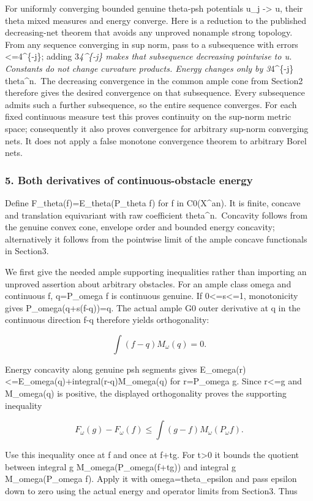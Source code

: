 \documentclass[
  10pt,
]{article}
\begin{document}
For uniformly converging bounded genuine theta-psh potentials u\_j
-\textgreater{} u, their theta mixed measures and energy converge. Here
is a reduction to the published decreasing-net theorem that avoids any
unproved nonample strong topology. From any sequence converging in sup
norm, pass to a subsequence with errors \textless=4\^{}\{-j\}; adding
3\emph{4\^{}\{-j\} makes that subsequence decreasing pointwise to u.
Constants do not change curvature products. Energy changes only by
3}4\^{}\{-j\} theta\^{}n.~The decreasing convergence in the common ample
cone from Section2 therefore gives the desired convergence on that
subsequence. Every subsequence admits such a further subsequence, so the
entire sequence converges. For each fixed continuous measure test this
proves continuity on the sup-norm metric space; consequently it also
proves convergence for arbitrary sup-norm converging nets. It does not
apply a false monotone convergence theorem to arbitrary Borel nets.

\subsubsection{5. Both derivatives of continuous-obstacle
energy}\label{both-derivatives-of-continuous-obstacle-energy}

Define F\_theta(f)=E\_theta(P\_theta f) for f in C0(X\^{}an). It is
finite, concave and translation equivariant with raw coefficient
theta\^{}n.~Concavity follows from the genuine convex cone, envelope
order and bounded energy concavity; alternatively it follows from the
pointwise limit of the ample concave functionals in Section3.

We first give the needed ample supporting inequalities rather than
importing an unproved assertion about arbitrary obstacles. For an ample
class omega and continuous f, q=P\_omega f is continuous genuine. If
0\textless=s\textless=1, monotonicity gives P\_omega(q+s(f-q))=q. The
actual ample G0 outer derivative at q in the continuous direction f-q
therefore yields orthogonality:

\[\int(f-q)M_\omega(q)=0.\]

Energy concavity along genuine psh segments gives
E\_omega(r)\textless=E\_omega(q)+integral(r-q)M\_omega(q) for r=P\_omega
g. Since r\textless=g and M\_omega(q) is positive, the displayed
orthogonality proves the supporting inequality

\[F_\omega(g)-F_\omega(f)\leq\int(g-f)M_\omega(P_\omega f).\]

Use this inequality once at f and once at f+tg. For t\textgreater0 it
bounds the quotient between integral g M\_omega(P\_omega(f+tg)) and
integral g M\_omega(P\_omega f). Apply it with omega=theta\_epsilon and
pass epsilon down to zero using the actual energy and operator limits
from Section3. Thus
\end{document}
